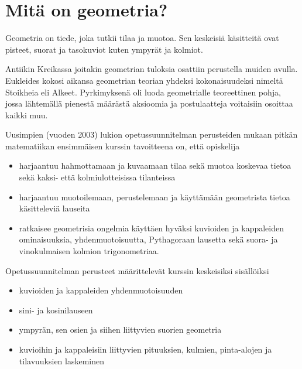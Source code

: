 \section*{Mitä on geometria?}

Geometria on tiede, joka tutkii tilaa ja muotoa. Sen keskeisiä käsitteitä ovat pisteet, suorat ja tasokuviot kuten ympyrät ja kolmiot. 

Antiikin Kreikassa joitakin geometrian tuloksia osattiin perustella muiden avulla. Eukleides kokosi aikansa geometrian teorian yhdeksi kokonaisuudeksi nimeltä Stoikheia eli Alkeet. Pyrkimyksenä oli luoda geometrialle teoreettinen pohja, jossa lähtemällä pienestä määrästä aksioomia ja postulaatteja voitaisiin osoittaa kaikki muu.

Uusimpien (vuoden 2003) lukion opetussuunnitelman perusteiden mukaan pitkän matematiikan ensimmäisen kurssin tavoitteena on, että opiskelija
\begin{itemize}
\item harjaantuu hahmottamaan ja kuvaamaan tilaa sekä muotoa koskevaa tietoa sekä kaksi- että kolmiulotteisissa tilanteissa
\item harjaantuu muotoilemaan, perustelemaan ja käyttämään geometrista tietoa käsitteleviä lauseita
\item ratkaisee geometrisia ongelmia käyttäen hyväksi kuvioiden ja kappaleiden ominaisuuksia, yhdenmuotoisuutta, Pythagoraan lausetta sekä suora- ja vinokulmaisen kolmion trigonometriaa.
\end{itemize}

Opetussuunnitelman perusteet määrittelevät kurssin keskeisiksi sisällöiksi
\begin{itemize}
\item kuvioiden ja kappaleiden yhdenmuotoisuuden
\item sini- ja kosinilauseen
\item ympyrän, sen osien ja siihen liittyvien suorien geometria
\item kuvioihin ja kappaleisiin liittyvien pituuksien, kulmien, pinta-alojen ja tilavuuksien laskeminen
\end{itemize}
